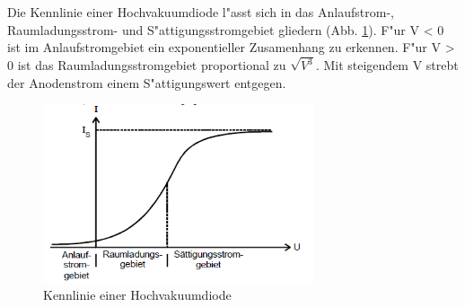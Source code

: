 Die Kennlinie einer Hochvakuumdiode l"asst sich in das Anlaufstrom-, Raumladungsstrom- und S"attigungsstromgebiet gliedern (Abb. \ref{kennlinie}).
F"ur V < 0 ist im Anlaufstromgebiet ein exponentieller Zusamenhang zu erkennen. F"ur V > 0 ist das Raumladungsstromgebiet proportional zu $\sqrt{V^3}$.
Mit steigendem V strebt der Anodenstrom einem S"attigungswert entgegen.

\begin{figure}[!h]
	\centering
	\includegraphics[width = 8cm]{img/kennlinie.PNG}
	\caption{Kennlinie einer Hochvakuumdiode}
	\label{kennlinie}
\end{figure}